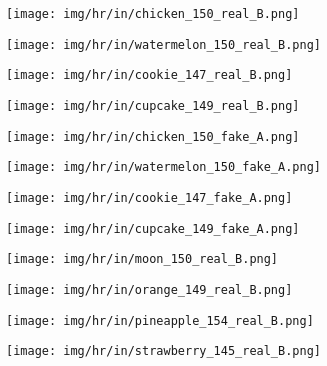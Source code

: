 \documentclass[10pt,twocolumn,letterpaper]{article}
\begin{document}
\begin{figure*}[tbp]
\captionsetup[subfigure]{labelformat=empty}
\begin{center}
  \begin{subfigure}[b]{\hrwidth\linewidth}
  \texttt{[image: img/hr/in/chicken\_150\_real\_B.png]}
  \end{subfigure}
  \begin{subfigure}[b]{\hrwidth\linewidth}
  \texttt{[image: img/hr/in/watermelon\_150\_real\_B.png]}
  \end{subfigure}
\begin{subfigure}[b]{\hrwidth\linewidth}
  \texttt{[image: img/hr/in/cookie\_147\_real\_B.png]}
  \end{subfigure}
  \begin{subfigure}[b]{\hrwidth\linewidth}
  \texttt{[image: img/hr/in/cupcake\_149\_real\_B.png]}
  \end{subfigure}

  \begin{subfigure}[b]{\hrwidth\linewidth}
  \texttt{[image: img/hr/in/chicken\_150\_fake\_A.png]}
  \end{subfigure}
  \begin{subfigure}[b]{\hrwidth\linewidth}
  \texttt{[image: img/hr/in/watermelon\_150\_fake\_A.png]}
  \end{subfigure}
\begin{subfigure}[b]{\hrwidth\linewidth}
  \texttt{[image: img/hr/in/cookie\_147\_fake\_A.png]}
  \end{subfigure}
  \begin{subfigure}[b]{\hrwidth\linewidth}
  \texttt{[image: img/hr/in/cupcake\_149\_fake\_A.png]}
  \end{subfigure}


  \begin{subfigure}[b]{\hrwidth\linewidth}
  \texttt{[image: img/hr/in/moon\_150\_real\_B.png]}
  \end{subfigure}
  \begin{subfigure}[b]{\hrwidth\linewidth}
  \texttt{[image: img/hr/in/orange\_149\_real\_B.png]}
  \end{subfigure}
\begin{subfigure}[b]{\hrwidth\linewidth}
  \texttt{[image: img/hr/in/pineapple\_154\_real\_B.png]}
  \end{subfigure}
  \begin{subfigure}[b]{\hrwidth\linewidth}
  \texttt{[image: img/hr/in/strawberry\_145\_real\_B.png]}
  \end{subfigure}


\end{center}
\end{figure*}
\end{document}
